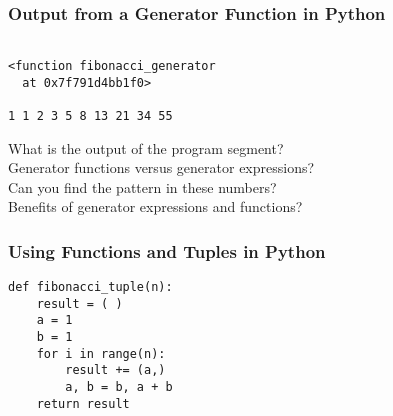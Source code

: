 \documentclass[14pt,aspectratio=169]{beamer}
\begin{document}
%
\begin{frame}[fragile]
  \frametitle{Output from a Generator Function in Python}
  \normalsize
  \begin{minipage}{6in}
    \vspace*{.1in}
    \begin{verbatim}

<function fibonacci_generator
  at 0x7f791d4bb1f0>

1 1 2 3 5 8 13 21 34 55
    \end{verbatim}
  \vspace*{.35in}
  \begin{minipage}{5.2in}
  \begin{center}
    \normalsize \noindent What is the output of the program segment? \\
    \normalsize \noindent Generator functions versus generator expressions? \\
    \normalsize \noindent Can you find the pattern in these numbers? \\
    \normalsize \noindent Benefits of generator expressions and functions? \\
  \end{center}
  \end{minipage}
  \end{minipage}
\end{frame}

%
\begin{frame}[fragile]
  \frametitle{Using Functions and Tuples in Python}
  \normalsize
  \begin{minipage}{6in}
    \vspace*{.1in}
    \begin{verbatim}
def fibonacci_tuple(n):
    result = ( )
    a = 1
    b = 1
    for i in range(n):
        result += (a,)
        a, b = b, a + b
    return result
    \end{verbatim}
  \end{minipage}
\end{frame}
\end{document}
